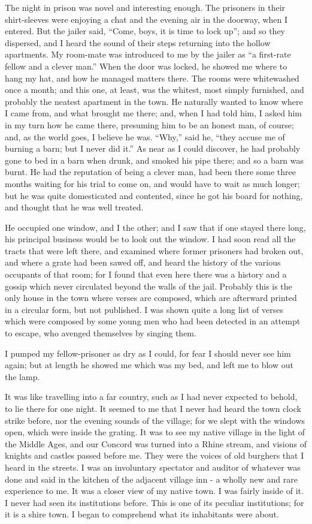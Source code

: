 \documentclass[letterpaper,12pt,english]{sphinxmanual}
\begin{document}
The night in prison was novel and interesting enough. The prisoners in their shirt-sleeves were enjoying a chat and the evening air in the doorway, when I entered. But the jailer said, ``Come, boys, it is time to lock up''; and so they dispersed, and I heard the sound of their steps returning into the hollow apartments. My room-mate was introduced to me by the jailer as ``a first-rate fellow and a clever man.'' When the door was locked, he showed me where to hang my hat, and how he managed matters there. The rooms were whitewashed once a month; and this one, at least, was the whitest, most simply furnished, and probably the neatest apartment in the town. He naturally wanted to know where I came from, and what brought me there; and, when I had told him, I asked him in my turn how he came there, presuming him to be an honest man, of course; and, as the world goes, I believe he was. ``Why,'' said he, ``they accuse me of burning a barn; but I never did it.'' As near as I could discover, he had probably gone to bed in a barn when drunk, and smoked his pipe there; and so a barn was burnt. He had the reputation of being a clever man, had been there some three months waiting for his trial to come on, and would have to wait as much longer; but he was quite domesticated and contented, since he got his board for nothing, and thought that he was well treated.

He occupied one window, and I the other; and I saw that if one stayed there long, his principal business would be to look out the window. I had soon read all the tracts that were left there, and examined where former prisoners had broken out, and where a grate had been sawed off, and heard the history of the various occupants of that room; for I found that even here there was a history and a gossip which never circulated beyond the walls of the jail. Probably this is the only house in the town where verses are composed, which are afterward printed in a circular form, but not published. I was shown quite a long list of verses which were composed by some young men who had been detected in an attempt to escape, who avenged themselves by singing them.

I pumped my fellow-prisoner as dry as I could, for fear I should never see him again; but at length he showed me which was my bed, and left me to blow out the lamp.

It was like travelling into a far country, such as I had never expected to behold, to lie there for one night. It seemed to me that I never had heard the town clock strike before, nor the evening sounds of the village; for we slept with the windows open, which were inside the grating. It was to see my native village in the light of the Middle Ages, and our Concord was turned into a Rhine stream, and visions of knights and castles passed before me. They were the voices of old burghers that I heard in the streets. I was an involuntary spectator and auditor of whatever was done and said in the kitchen of the adjacent village inn - a wholly new and rare experience to me. It was a closer view of my native town. I was fairly inside of it. I never had seen its institutions before. This is one of its peculiar institutions; for it is a shire town. I began to comprehend what its inhabitants were about.
\end{document}
